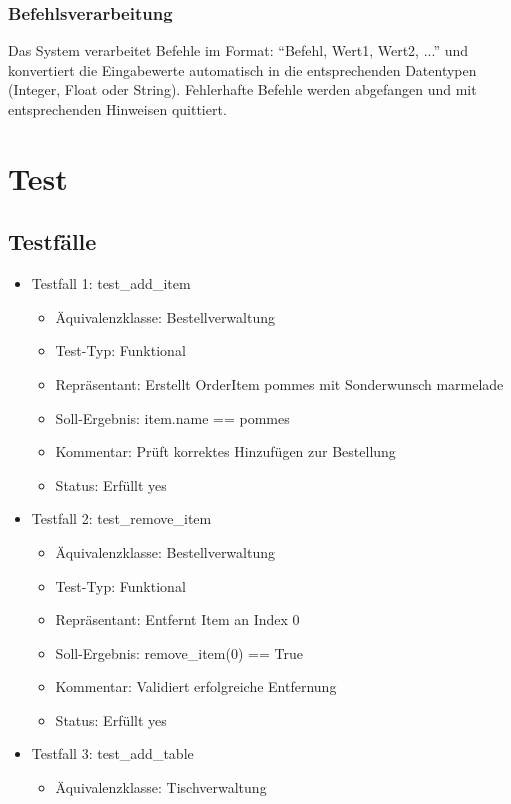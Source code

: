 \documentclass[a4paper,11pt]{article}
\begin{document}
\subsubsection{Befehlsverarbeitung}
Das System verarbeitet Befehle im Format: ``Befehl, Wert1, Wert2, ...'' und konvertiert die Eingabewerte automatisch in die entsprechenden Datentypen (Integer, Float oder String). Fehlerhafte Befehle werden abgefangen und mit entsprechenden Hinweisen quittiert.


\section{Test}
\subsection{Testfälle}
\begin{itemize}
    \item Testfall 1: test\_add\_item
    \begin{itemize}
        \item Äquivalenzklasse: Bestellverwaltung
        \item Test-Typ: Funktional
        \item Repräsentant: Erstellt OrderItem pommes mit Sonderwunsch marmelade
        \item Soll-Ergebnis: item.name == pommes
        \item Kommentar: Prüft korrektes Hinzufügen zur Bestellung
        \item Status: Erfüllt yes
    \end{itemize}
    \item Testfall 2: test\_remove\_item
    \begin{itemize}
        \item Äquivalenzklasse: Bestellverwaltung
        \item Test-Typ: Funktional
        \item Repräsentant: Entfernt Item an Index 0
        \item Soll-Ergebnis: remove\_item(0) == True
        \item Kommentar: Validiert erfolgreiche Entfernung
        \item Status: Erfüllt yes
    \end{itemize}
    \item Testfall 3: test\_add\_table
    \begin{itemize}
        \item Äquivalenzklasse: Tischverwaltung

\end{itemize}
\end{itemize}
\end{document}
